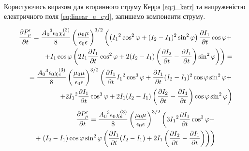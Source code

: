 Користуючись виразом для вторинного струму Керра \eqref{eq:j_kerr} та 
напруженістю електричного поля \eqref{eq:linear_e_cyl}, запишемо компоненти 
струму.

\textcolor{blue} { \begin{equation*} \begin{aligned}
\frac{\partial P_\rho^\prime}{\partial t}   = \frac{ {A_0}^3 \epsilon_0 \chi_e^{(3)} }{ 8 } 
\left( \frac{\mu_0 \mu} {\epsilon_0 \epsilon} \right)^{3/2} \left(
\left( {I_1}^2 \cos^2 \varphi + ( I_2 - I_1 )^2 \sin^2 \varphi \right)
\frac{\partial I_1}{\partial t} \cos \varphi + \right. \\
\left. + I_1 \cos \varphi \left( 2 I_1 \frac{\partial I_1}{\partial t} \cos^2 \varphi + 
2 ( I_2 - I_1 ) \left( \frac{\partial I_2}{\partial t} - \frac{\partial I_1}{\partial t} \right) 
\sin^2 \varphi \right) \right) = \\ 
= \frac{ {A_0}^3 \epsilon_0 \chi_e^{(3)} }{ 8 } 
\left( \frac{\mu_0 \mu} {\epsilon_0 \epsilon} \right)^{3/2} \left(
\frac{\partial I_1}{\partial t} {I_1}^2 \cos^3 \varphi + \frac{\partial I_1}{\partial t} ( I_2 - I_1 )^2 
\cos \varphi \sin^2 \varphi + \right. \\
\left. + 2 {I_1}^2 \frac{\partial I_1}{\partial t} \cos^3 \varphi + 
2 I_1 ( I_2 - I_1 ) \left( \frac{\partial I_2}{\partial t} - \frac{\partial I_1}{\partial t} \right) 
\cos \varphi \sin^2 \varphi \right)
\end{aligned} \end{equation*} }
%
\begin{equation*} \begin{aligned}
\frac{\partial P_\rho^\prime}{\partial t} = \frac{ {A_0}^3 \epsilon_0 \chi_e^{(3)} }{ 8 } 
\left( \frac{\mu_0 \mu} {\epsilon_0 \epsilon} \right)^{3/2} \left(
3 {I_1}^2 \frac{\partial I_1}{\partial t} \cos^3 \varphi + \right. \\
+ \left. ( I_2 - I_1 ) \cos \varphi \sin^2 \varphi \left( 
\frac{\partial I_1}{\partial t} ( I_2 - I_1 ) + 2 I_1 \left( \frac{\partial I_2}{\partial t} - 
\frac{\partial I_1}{\partial t} \right) \right) \right)
\end{aligned} \end{equation*}
%
